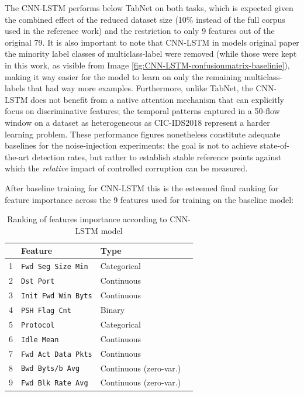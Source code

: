 \documentclass[../main.tex]{subfiles}
\begin{document}
The CNN-LSTM performs below TabNet on both tasks, which is expected given the combined effect of the reduced dataset size (10\% instead of the full corpus used in the reference work\supercite{jablaoui2024effective}) and the restriction to only 9 features out of the original 79. It is also important to note that CNN-LSTM in models original paper\supercite{jablaoui2024effective} the minority label classes of multiclass-label were removed (while those were kept in this work, as visible from Image \ref{fig:CNN-LSTM-confusionmatrix-baselinie}), making it way easier for the model to learn on only the remaining multiclass-labels that had way more examples. Furthermore, unlike TabNet, the CNN-LSTM does not benefit from a native attention mechanism that can explicitly focus on discriminative features; the temporal patterns captured in a 50-flow window on a dataset as heterogeneous as CIC-IDS2018 represent a harder learning problem.  These performance figures nonetheless constitute adequate baselines for the noise-injection experiments: the goal is not to achieve state-of-the-art detection rates, but rather to establish stable reference points against which the \emph{relative} impact of controlled corruption can be measured.


After baseline training for CNN-LSTM this is the esteemed final ranking for feature importance across the 9 features used for training on the baseline model:

\begin{table}[H]
    \centering
    \caption{Ranking of features importance according to CNN-LSTM model}
    \label{tab:final-ranking-features-CNN-LSTM-baseline}
    \small
    \begin{tabular}{lllr}
    \toprule
    \textbf{} & \textbf{Feature}            & \textbf{Type} \\
    \midrule
     1 &  \texttt{Fwd Seg Size Min}   & Categorical            \\
     2 &  \texttt{Dst Port}           & Continuous             \\
     3 &  \texttt{Init Fwd Win Byts}  & Continuous             \\
     4 & \texttt{PSH Flag Cnt}        & Binary                 \\
     5 & \texttt{Protocol}            & Categorical            \\
     6 & \texttt{Idle Mean}           & Continuous             \\
     7 &  \texttt{Fwd Act Data Pkts}  & Continuous             \\
     8 & \texttt{Bwd Byts/b Avg}      & Continuous (zero-var.) \\
     9 & \texttt{Fwd Blk Rate Avg}    & Continuous (zero-var.) \\
    \bottomrule
    \end{tabular}
\end{table}
\end{document}

